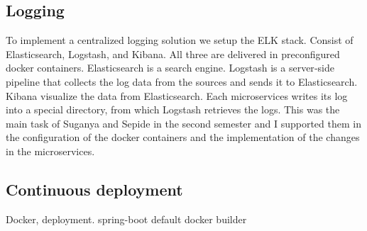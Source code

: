 \subsection{Logging}
To implement a centralized logging solution we setup the ELK stack. Consist of Elasticsearch, Logstash, and Kibana. All three are delivered in preconfigured docker containers. Elasticsearch is a search engine. Logstash is a server‑side pipeline that collects the log data from the sources and sends it to Elasticsearch. Kibana visualize the data from Elasticsearch. Each microservices writes its log into a special directory, from which Logstash retrieves the logs. This was the main task of Suganya and Sepide in the second semester and I supported them in the configuration of the docker containers and the implementation of the changes in the microservices.

\subsection{Continuous deployment}
Docker, deployment. spring-boot default docker builder\\